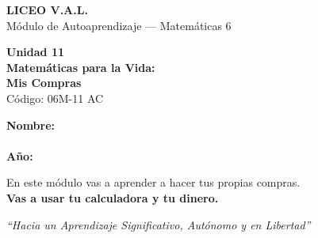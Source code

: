 \documentclass[12pt]{article}
\begin{document}

\thispagestyle{empty}
\begin{center}
  {\LARGE\bfseries LICEO V.A.L.}\\[0.4cm]
  {\large Módulo de Autoaprendizaje --- Matemáticas 6\textdegree}\\[0.6cm]

  \begin{tcolorbox}[colback=valblue!12, colframe=valblue,
      arc=5mm, boxrule=2.5pt, width=\linewidth]
    \centering
    {\fontsize{26}{30}\selectfont\bfseries
      \textcolor{valblue}{Unidad 11}}\\[0.3cm]
    {\LARGE\bfseries Matemáticas para la Vida:}\\[0.2cm]
    {\LARGE\bfseries Mis Compras}\\[0.3cm]
    {\normalsize Código: 06M-11 AC}
  \end{tcolorbox}

  \vspace{0.7cm}
  \begin{tcolorbox}[colback=white, colframe=valblue,
      arc=4mm, boxrule=1.5pt, width=11cm]
    \centering
    \textbf{Nombre:}\\[0.4cm]
    \underline{\hspace{8cm}}\\[0.5cm]
    \textbf{Año:}\;\underline{\hspace{2cm}}
  \end{tcolorbox}

  \vspace{0.8cm}
  \begin{tcolorbox}[colback=valorange!10, colframe=valorange,
      arc=4mm, boxrule=1.5pt, width=\linewidth]
    \centering\large
    En este módulo vas a aprender a hacer tus propias compras.\\[0.2cm]
    \bfseries Vas a usar tu calculadora y tu dinero.
  \end{tcolorbox}

  \vspace{0.5cm}
  {\large\textit{``Hacia un Aprendizaje Significativo,
  Autónomo y en Libertad''}}
\end{center}

\newpage
\end{document}
